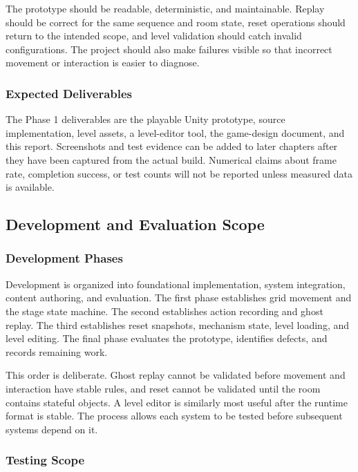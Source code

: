
The prototype should be readable, deterministic, and maintainable. Replay should be correct for the same sequence and room state, reset operations should return to the intended scope, and level validation should catch invalid configurations. The project should also make failures visible so that incorrect movement or interaction is easier to diagnose.

\subsubsection{Expected Deliverables}

The Phase 1 deliverables are the playable Unity prototype, source implementation, level assets, a level-editor tool, the game-design document, and this report. Screenshots and test evidence can be added to later chapters after they have been captured from the actual build. Numerical claims about frame rate, completion success, or test counts will not be reported unless measured data is available.

\subsection{Development and Evaluation Scope}

\subsubsection{Development Phases}

Development is organized into foundational implementation, system integration, content authoring, and evaluation. The first phase establishes grid movement and the stage state machine. The second establishes action recording and ghost replay. The third establishes reset snapshots, mechanism state, level loading, and level editing. The final phase evaluates the prototype, identifies defects, and records remaining work.

This order is deliberate. Ghost replay cannot be validated before movement and interaction have stable rules, and reset cannot be validated until the room contains stateful objects. A level editor is similarly most useful after the runtime format is stable. The process allows each system to be tested before subsequent systems depend on it.

\subsubsection{Testing Scope}

